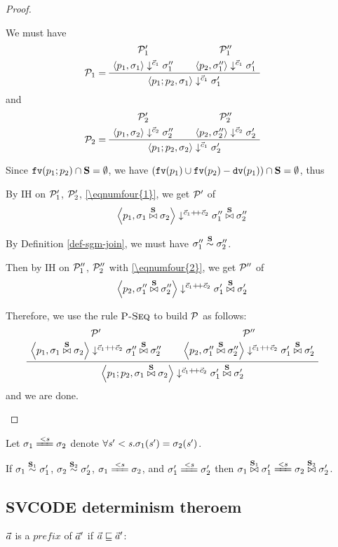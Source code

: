 \begin{proof}
\begin{itemize}
	 We must have 
	$$	\PT{
				\UCN{\MP_1'}{\seval{p_1}{\sgm_1}{\c_1}{\sgm_1''}}
				\UCN{\MP_1''}{\seval{p_2}{\sgm_1''}{\c_1}{\sgm_1'}}	
				\LeLa{\MP_1 = }
				\BC{\seval{p_1;p_2}{\sgm_1}{\c_1}{\sgm_1'}}
		}$$	
	and
	 $$ \PT{
	  		\UCN{\MP_2'}{\seval{p_1}{\sgm_2}{\c_2}{\sgm_2''}}
	  		\UCN{\MP_2''}{\seval{p_2}{\sgm_2''}{\c_2}{\sgm_2'}}	
	  		\LeLa{\MP_2 = }
	  		\BC{\seval{p_1;p_2}{\sgm_2}{\c_1}{\sgm_2'}}
	  }	$$
	
	Since $\mathtt{fv}(p_1;p_2) \cap \mathbf{S} = \emptyset$, we have $(\mathtt{fv}(p_1) \cup \mathtt{fv}(p_2) - \mathtt{dv}(p_1)) \cap \mathbf{S} = \emptyset$, thus 

\def\sgmxpp{\sgm_1'' \x{\S} \sgm_2''}    

    By IH on $\mathcal{P}_1'$, $\mathcal{P}_2'$, \eqref{\eqnumfour{1}}, we get $\mathcal{P}'$ of
    $$\seval{p_1}{\sgmx}{\cc}{\sgmxpp}$$
    
    By Definition \ref{def-sgm-join}, we must have $\sigma_1'' \stackrel{\mathbf{S}}{\sim} \sigma_2''$.
    
    Then by IH on $\mathcal{P}_1''$, $\mathcal{P}_2''$ with \eqref{\eqnumfour{2}}, we get $\mathcal{P}''$ of $$\seval{p_2}{\sgmxpp}{\cc}{\sgmpx}$$
    
    Therefore, we use the rule $\textsc{P-Seq}$ to build $\mathcal{P}$ as follows:
    	 $$ \PT{
    		\UCN{\MP'}{\seval{p_1}{\sgmx}{\cc}{\sgmxpp}}
    		\UCN{\MP''}{\seval{p_2}{\sgmxpp}{\cc}{\sgmpx}}	
    		\BC{\seval{p_1;p_2}{\sgmx}{\cc}{\sgmpx}}
    	}	$$
     and we are done.
	\end{itemize}
\end{proof}

Let $\sgm_1 \ConEq{\s} \sgm_2$ denote $\forall \mathit{s}' < \mathit{s}. \sigma_1(\mathit{s}') = \sigma_2(\mathit{s}')$. 
	
\begin{lem}\label{lem-join2}
	If $\sigma_1 \stackrel{\mathbf{S}_1}{\sim} \sigma'_1$, $\sigma_2 \stackrel{\mathbf{S}_2}{\sim} \sigma'_2$, $\sgm_1 \ConEq{s} \sgm_2$,
	and $\sgm'_1 \ConEq{\s} \sgm_2'$  
	then $\sgm_1 \x{\S_1} \sgm_1' \ConEq{s} \sgm_2 \x{\S_2} \sgm'_2$. 
\end{lem}

\subsection{SVCODE determinism theroem}

\begin{defi}
	$\vec a$ is a $prefix$ of $\vec a'$ if $\vec a \sqsubseteq \vec a'$: \\
	\PT{\Axiom{\emptyv \prefix \a }}
	
\end{defi}


